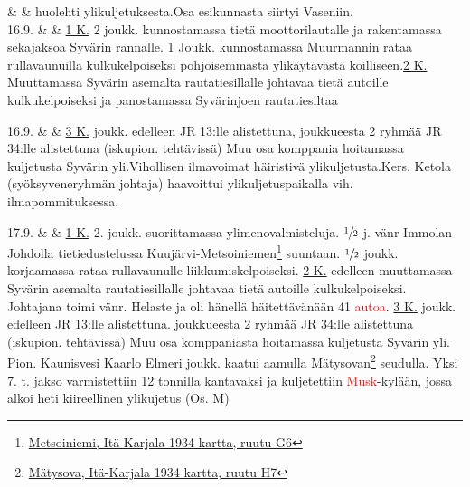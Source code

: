 \documentclass[11pt,a5paper,oneside]{book}
\begin{document}
\newpage

& & huolehti ylikuljetuksesta.\newline\newline\newline Osa esikunnasta siirtyi Vaseniin. \newline\newline\newline\newline\newline\newline \\

16.9. & & \underline{1 K.} 2 joukk. kunnostamassa tietä moottorilautalle ja rakentamassa sekajaksoa Syvärin rannalle. 1 Joukk. kunnostamassa Muurmannin rataa rullavaunuilla kulkukelpoiseksi pohjoisemmasta ylikäytävästä koilliseen.\newline\newline \underline{2 K.} Muuttamassa Syvärin asemalta rautatiesillalle johtavaa tietä autoille kulkukelpoiseksi ja panostamassa Syvärinjoen rautatiesiltaa \\

\taulustop


16.9. & & \underline{3 K.}  joukk. edelleen JR 13:lle alistettuna,  joukkueesta 2 ryhmää JR 34:lle alistettuna (iskupion. tehtävissä) Muu osa komppania hoitamassa kuljetusta Syvärin yli.\newline Vihollisen ilmavoimat häiristivä ylikuljetusta.\newline Kers. Ketola (syöksyveneryhmän johtaja) haavoittui ylikuljetuspaikalla vih. ilmapommituksessa. \\

\newpage

17.9. & & \underline{1 K.} 2. joukk. suorittamassa ylimenovalmisteluja. $\sfrac{1}{2}$ j. vänr Immolan Johdolla tietiedustelussa Kuujärvi-Metsoiniemen\footnote{\href{https://www.google.fi/maps/place/61\%C2\%B008'13.7\%22N+33\%C2\%B050'07.6\%22E/@61.1371306,33.8332443,1153m/}{Metsoiniemi, Itä-Karjala 1934 kartta, ruutu G6}} suuntaan. $\sfrac{1}{2}$ joukk. korjaamassa rataa rullavaunulle liikkumiskelpoiseksi. \newline\newline \underline{2 K.} edelleen muuttamassa Syvärin asemalta rautatiesillalle johtavaa tietä autoille kulkukelpoiseksi. Johtajana toimi vänr. Helaste ja oli hänellä häitettävänään 41 \textcolor{red}{autoa}. \newline\newline \underline{3 K.}  joukk. edelleen JR 13:lle alistettuna.  joukkueesta 2 ryhmää JR 34:lle alistettuna (iskupion. tehtävissä) Muu osa komppaniasta hoitamassa kuljetusta Syvärin yli. Pion. Kaunisvesi Kaarlo Elmeri  joukk. kaatui aamulla Mätysovan\footnote{\href{https://www.google.fi/maps/place/Myatusovo,+Leningrad+Oblast,+Russia,+187790/}{Mätysova, Itä-Karjala 1934 kartta, ruutu H7}} seudulla. Yksi 7. t. jakso varmistettiin 12 tonnilla kantavaksi ja kuljetettiin \textcolor{red}{Musk}-kylään, jossa alkoi heti kiireellinen ylikujetus (Os. M) \\

\taulustop

\end{document}
